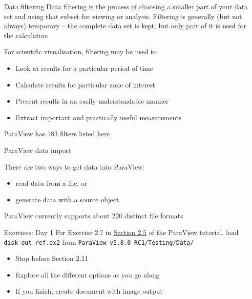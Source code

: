 \documentclass{beamer}
\begin{document}
\begin{frame}{Data filtering}
Data filtering is the process of choosing a smaller part of your data set and using that subset for viewing or analysis. Filtering is generally (but not always) temporary – the complete data set is kept, but only part of it is used for the calculation

\vskip 12pt

For scientific visualisation, filtering may be used to
\begin{itemize}
    \item Look at results for a particular period of time
    \item Calculate results for particular zone of interest
    \item Present results in an easily understandable manner
    \item Extract important and practically useful measurements
\end{itemize}{}
ParaView has 183 filters listed \href{https://www.paraview.org/Wiki/ParaView/Users_Guide/List_of_filters}{\underline{here}}
\end{frame}{}

\begin{frame}{ParaView data import}
    
    There are two ways to get data into ParaView:
    \begin{itemize}
        \item read data from a file, or
        \item generate data with a source object.
    \end{itemize}{}
    
    \vskip 12pt
    
    ParaView currently supports about 220 distinct file formats
    
\end{frame}{}

\begin{frame}{Exercises: Day 1}
    For Exercise 2.7 in \href{https://docs.paraview.org/en/latest/Tutorials/SelfDirectedTutorial/basicUsage.html#loading-data}{\underline{Section 2.5}}  of the ParaView tutorial, load \texttt{disk\_out\_ref.ex2} from \texttt{ParaView-v5.8.0-RC1/Testing/Data/}
    \begin{itemize}
        \item Stop before Section 2.11
        \item Explore all the different options as you go along
        \item If you finish, create document with image output
    \end{itemize}

    
    
\end{frame}
\end{document}
